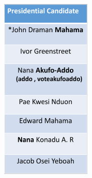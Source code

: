 \documentclass[12pt,notitlepage]{article}
\begin{document}
\begin{figure}[htb]
\begin{minipage}[b]{0.15\textwidth}
		\includegraphics[width=\textwidth]{WordCloudAnalystGana_4.pdf}
		\caption{}
		\label{fig:WordCloudAnalystGana_4}
	\end{minipage}
\end{figure}
\end{document}
